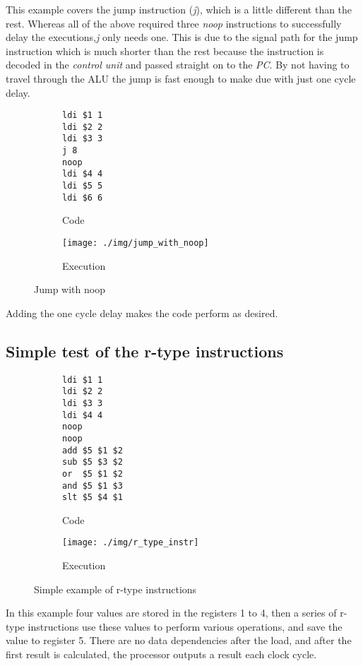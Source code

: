 This example covers the jump instruction (\emph{j}), which is a little different than the rest. Whereas all of the above required three \emph{noop} instructions to successfully delay the executions,\emph{j} only needs one. This is due to the signal path for the jump instruction which is much shorter than the rest because the instruction is decoded in the \emph{control unit} and passed straight on to the \emph{PC}. By not having to travel through the ALU the jump is fast enough to make due with just one cycle delay.
\\
\begin{figure}[H]
	\begin{subfigure}[b]{.5\linewidth}
		\begin{lstlisting}[language={[mips]Assembler}]
ldi $1 1
ldi $2 2
ldi $3 3
j 8
noop
ldi $4 4
ldi $5 5
ldi $6 6
		\end{lstlisting}
		\caption{Code}
		\label{code:jump_with_noop}
	\end{subfigure}
	\begin{subfigure}[b]{.5\linewidth}
		\centering
		\texttt{[image: ./img/jump\_with\_noop]}
		\caption{Execution}
		\label{img:jump_with_noop}
	\end{subfigure}
	\caption{Jump with noop}
	\label{jump_with_noop}
\end{figure}

Adding the one cycle delay makes the code perform as desired.

\subsection{Simple test of the r-type instructions} %
\label{sub:simple_test_of_the_r_type_instructions}
\begin{figure}[H]
	\begin{subfigure}[b]{.5\linewidth}
		\begin{lstlisting}[language={[mips]Assembler}]
ldi	$1 1
ldi	$2 2
ldi	$3 3
ldi	$4 4
noop
noop
add	$5 $1 $2
sub	$5 $3 $2
or	$5 $1 $2
and	$5 $1 $3
slt	$5 $4 $1
		\end{lstlisting}
		\caption{Code}
		\label{code:jump_with_noop}
	\end{subfigure}
	\begin{subfigure}[b]{.5\linewidth}
		\centering
		\texttt{[image: ./img/r\_type\_instr]}
		\caption{Execution}
		\label{img:jump_with_noop}
	\end{subfigure}
	\caption{Simple example of r-type instructions}
	\label{jump_with_noop}
\end{figure}
In this example four values are stored in the registers 1 to 4, then a series of r-type instructions use these values to perform various operations, and save the value to register 5. There are no data dependencies after the load, and after the first result is calculated, the processor outputs a result each clock cycle.

